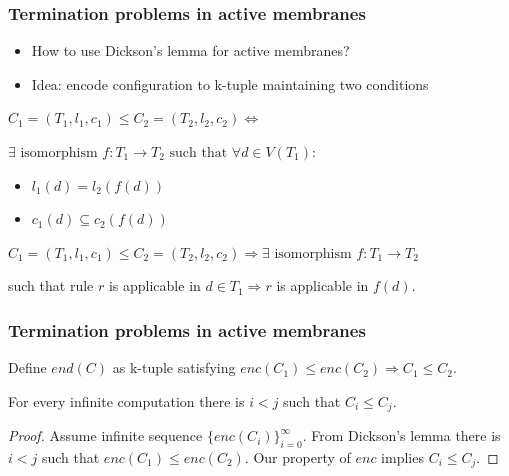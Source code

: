     \begin{frame}[t]\frametitle{Termination problems in active membranes}
      \begin{itemize}
        \item How to use Dickson's lemma for active membranes?
        \item Idea: encode configuration to k-tuple maintaining two conditions
      \end{itemize}
      \pause

      \begin{definition}
        $C_1 = (T_1, l_1, c_1) \leq C_2 = (T_2, l_2, c_2) \Leftrightarrow$
      
        $\exists \text{~isomorphism~} f: T_1\rightarrow T_2 \text{~such that~}\forall d\in V(T_1):$
        \begin{itemize}
          \item $l_1(d) = l_2(f(d))$
          \item $c_1(d) \subseteq c_2(f(d))$
        \end{itemize}
      \end{definition}
      \pause
      
      \begin{lemma}
        $C_1 = (T_1, l_1, c_1) \leq C_2 = (T_2, l_2, c_2) \Rightarrow \exists \text{~isomorphism~} f: T_1 \rightarrow T_2$

        such that rule $r$ is applicable in $d\in T_1 \Rightarrow r$ is applicable in $f(d)$.
      \end{lemma}
    \end{frame}

    \begin{frame}[t]\frametitle{Termination problems in active membranes}
      \begin{definition}
        Define $end(C)$ as k-tuple satisfying $enc(C_1)\leq enc(C_2) \Rightarrow C_1\leq C_2$.
      \end{definition}
      \pause

      \begin{lemma}
        For every infinite computation there is $i<j$ such that $C_i\leq C_j$.
      \end{lemma}
      \pause

      \begin{proof}
        Assume infinite sequence $\{enc(C_i)\}_{i=0}^\infty$. From Dickson's lemma there is $i<j$ such that $enc(C_1)\leq enc(C_2)$. Our property of $enc$ implies $C_i\leq C_j$. 
      \end{proof}
    \end{frame}

